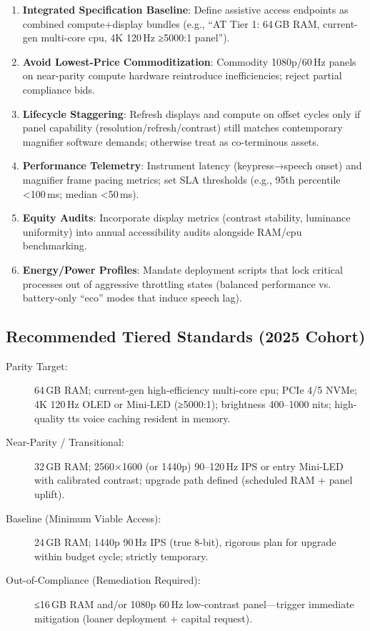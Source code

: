 \begin{enumerate}
	\item \textbf{Integrated Specification Baseline}: Define assistive access endpoints as combined compute+display bundles (e.g., “AT Tier 1: 64\,GB RAM, current-gen multi-core \gls{cpu}, 4K 120\,Hz ≥5000:1 panel”).
	\item \textbf{Avoid Lowest-Price Commoditization}: Commodity 1080p/60\,Hz panels on near-parity compute hardware reintroduce inefficiencies; reject partial compliance bids.
	\item \textbf{Lifecycle Staggering}: Refresh displays and compute on offset cycles only if panel capability (resolution/refresh/contrast) still matches contemporary magnifier software demands; otherwise treat as co-terminous assets.
	\item \textbf{Performance Telemetry}: Instrument latency (keypress→speech onset) and magnifier frame pacing metrics; set SLA thresholds (e.g., 95th percentile <100\,ms; median <50\,ms).
	\item \textbf{Equity Audits}: Incorporate display metrics (contrast stability, luminance uniformity) into annual accessibility audits alongside RAM/\gls{cpu} benchmarking.
	\item \textbf{Energy/Power Profiles}: Mandate deployment scripts that lock critical processes out of aggressive throttling states (balanced performance vs. battery-only “eco” modes that induce speech lag).
\end{enumerate}

\subsection*{Recommended Tiered Standards (2025 Cohort)}

\begin{description}
	\item[Parity Target:] 64\,GB RAM; current-gen high-efficiency multi-core \gls{cpu}; PCIe 4/5 NVMe; 4K 120\,Hz OLED or Mini‑LED (≥5000:1); brightness 400–1000 nits; high-quality \gls{tts} voice caching resident in memory.
	\item[Near-Parity / Transitional:] 32\,GB RAM; 2560×1600 (or 1440p) 90–120\,Hz IPS or entry Mini‑LED with calibrated contrast; upgrade path defined (scheduled RAM + panel uplift).
	\item[Baseline (Minimum Viable Access):] 24\,GB RAM; 1440p 90\,Hz IPS (true 8-bit), rigorous plan for upgrade within budget cycle; strictly temporary.
	\item[Out-of-Compliance (Remediation Required):] ≤16\,GB RAM and/or 1080p 60\,Hz low-contrast panel—trigger immediate mitigation (loaner deployment + capital request).
\end{description}

